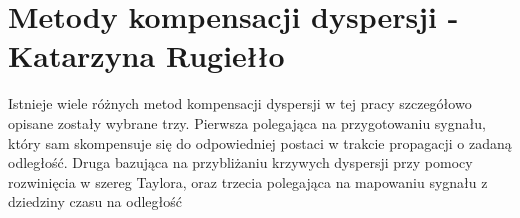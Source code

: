 
\chapter{Metody kompensacji dyspersji - Katarzyna Rugiełło}
\label{cha:comp_disp}
 
Istnieje wiele różnych metod kompensacji dyspersji w tej pracy szczegółowo opisane zostały wybrane trzy. Pierwsza polegająca na przygotowaniu sygnału, który sam skompensuje się do odpowiedniej postaci w trakcie propagacji o zadaną odległość. Druga bazująca na przybliżaniu krzywych dyspersji przy pomocy rozwinięcia w szereg Taylora, oraz trzecia polegająca na mapowaniu sygnału z dziedziny czasu na odległość 
 






